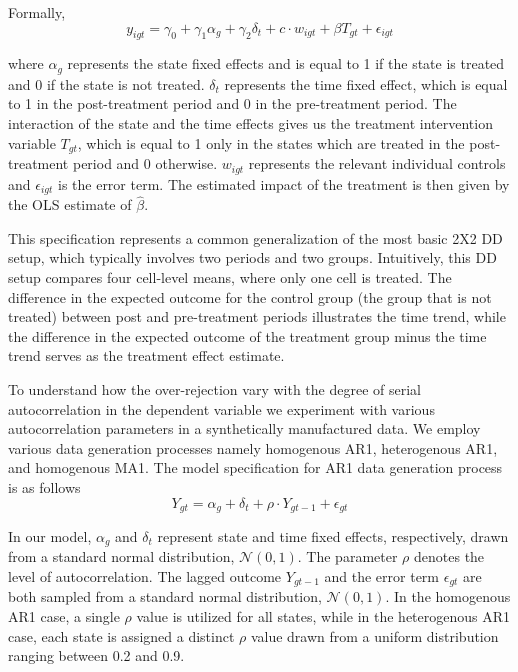 \documentclass[11pt, a4paper, leqno]{article}
\begin{document}
Formally,
\begin{equation}
y_{igt} = \gamma_0 + \gamma_1\alpha_g + \gamma_2\delta_t + c \cdot w_{igt} + \beta T_{gt} + \epsilon_{igt} \label{eq:1}
\end{equation}

where $\alpha_g$ represents the state fixed effects and is equal to 1 if the state is treated and 0 if the state is not treated. $\delta_t$ represents the time fixed effect, 
which is equal to 1 in the post-treatment period and 0 in the pre-treatment period. The interaction of the state and the time effects gives us the treatment intervention variable $T_{gt}$, 
which is equal to 1 only in the states which are treated in the post-treatment period and 0 otherwise. $w_{igt}$ represents the relevant individual controls and $\epsilon_{igt}$ is the error term. 
The estimated impact of the treatment is then given by the OLS estimate of $\hat{\beta}$.

This specification represents a common generalization of the most basic 2X2 DD setup, which typically involves two periods and two groups. Intuitively, this DD setup compares four cell-level means, where only one cell is treated. 
The difference in the expected outcome for the control group (the group that is not treated) between post and pre-treatment periods illustrates the time trend, while the difference in the expected outcome of the treatment group minus the 
time trend serves as the treatment effect estimate.

To understand how the over-rejection vary with the degree of serial autocorrelation in the dependent variable we experiment with various autocorrelation parameters in a synthetically manufactured data.
We employ various data generation processes namely homogenous AR1, heterogenous AR1, and homogenous MA1.
The model specification for AR1 data generation process is as follows
\begin{equation}
Y_{gt} = \alpha_g + \delta_t + \rho \cdot Y_{gt-1} + \epsilon_{gt} \label{eq:2}
\end{equation}

In our model, $\alpha_{g}$ and $\delta_{t}$ represent state and time fixed effects, respectively, drawn from a standard normal distribution, $\mathcal{N}(0,1)$. The parameter $\rho$ denotes the level of autocorrelation. The lagged outcome $Y_{gt-1}$ and 
the error term $\epsilon_{gt}$ are both sampled from a standard normal distribution, $\mathcal{N}(0,1)$. In the homogenous AR1 case, a single $\rho$ value is utilized for all states, while in the heterogenous AR1 case, each state is assigned a distinct $\rho$ 
value drawn from a uniform distribution ranging between 0.2 and 0.9.
\end{document}
